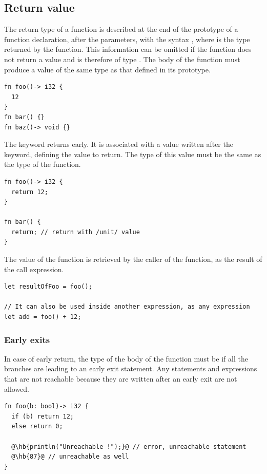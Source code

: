 \subsection{Return value}

The return type of a function is described at the end of the prototype of a
function declaration, after the parameters, with the syntax , where
 is the type returned by the function. This information can be omitted
if the function does not return a value and is therefore of type .
The body of the function must produce a value of the same type as that defined
in its prototype.

\begin{lstlisting}[style=coloredverbatim]
fn foo()-> i32 {
  12
}
fn bar() {}
fn baz()-> void {}
\end{lstlisting}

The keyword  returns early. It is associated with a
value written after the keyword, defining the value to return. The type of this
value must be the same as the type of the function.

\begin{lstlisting}[style=coloredverbatim]
fn foo()-> i32 {
  return 12;
}

fn bar() {
  return; // return with /unit/ value
}
\end{lstlisting}

The value of the function is retrieved by the caller of the function, as the
result of the call expression.

\begin{lstlisting}[style=coloredverbatim]
let resultOfFoo = foo();

// It can also be used inside another expression, as any expression
let add = foo() + 12;
\end{lstlisting}

\subsubsection*{Early exits}
\label{sec:global:function_early_return}

In case of early return, the type of the body of the function must be
 if all the branches are leading to an early exit statement. Any
statements and expressions that are not reachable because they are written
after an early exit are not allowed.

\begin{lstlisting}[style=coloredverbatimError, escapechar=@]
fn foo(b: bool)-> i32 {
  if (b) return 12;
  else return 0;

  @\hb{println("Unreachable !");}@ // error, unreachable statement
  @\hb{87}@ // unreachable as well
}
\end{lstlisting}

